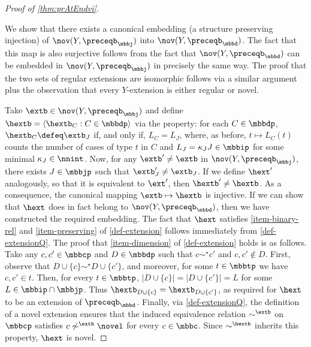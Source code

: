 \label{proofsection:prAtEndvi}\begin{proof}[Proof of \autoref{thm:prAtEndvi}]\label{proof:prAtEndvi}\label {proof-nov-iso} \par We show that there exists a canonical embedding (a structure preserving injection) of $ \nov ( Y , \preceqb _ \mbbj ) $ into $ \nov ( Y , \preceqb _ \mbbd ) $. The fact that this map is also surjective follows from the fact that $ \nov ( Y , \preceqb _ \mbbd ) $ can be embedded in $ \nov ( Y , \preceqb _ \mbbj ) $ in precisely the same way. The proof that the two sets of regular extensions are isomorphic follows via a similar argument plus the observation that every $Y$-extension is either regular or novel. \par Take $ \extb \in \nov ( Y , \preceqb _ \mbbj )$ and define $ \hextb = \langle \hextb _{C} : C \in \mbbdp \rangle $ via the property: for each $ C \in \mbbdp $, $ \hextb _{C}\defeq \extb _{J} $ if, and only if, $ L_{C}= L_{J} $, where, as before, $t \mapsto L_{C}(t) $ counts the number of cases of type $t$ in $C$ and $ L_{J} = \kappa _{J} J \in \mbbip $ for some minimal $\kappa _{J} \in \nnint $. Now, for any $ \extb ' \neq \extb $ in $ \nov ( Y , \preceqb _ \mbbj ) $, there exists $J\in \mbbjp $ such that $\extb '_{J}\neq \extb _{J}$. If we define $ \hext ' $ analogously, so that it is equivalent to $\ext '$, then $ \hextb ' \neq \hextb $. As a consequence, the canonical mapping $\extb \mapsto \hextb $ is injective. If we can show that $ \hext $ does in fact belong to $ \nov ( Y , \preceqb _ \mbbd )$, then we have constructed the required embedding. The fact that $ \hext $ satisfies \ref {item-binary-rel} and \ref {item-preserving} of \cref {def-extension} follows immediately from \cref {def-extensionQ}. The proof that \cref {item-dimension} of \cref {def-extension} holds is as follows. Take any $ c , c ' \in \mbbcp $ and $ D \in \mbbdp $ such that $ c \sim ^ \star c ' $ and $ c , c ' \notin D $. First, observe that $ D \cup \{c\} \sim ^ \star D \cup \{c'\} $, and moreover, for some $ t \in \mbbtp $ we have $ c , c ' \in t $. Then, for every $t\in \mbbtp $, $ \lvert D \cup \{c\} \rvert = \lvert D \cup \{c'\} \rvert = L$ for some $ L \in \mbbip \cap \mbbjp $. Thus $ \hextb _ { D \cup \{c\} } = \hextb _ { D \cup \{c'\}}$, as required for $ \hext $ to be an extension of $ \preceqb _{ \mbbd }$. Finally, via \cref {def-extensionQ}, the definition of a novel extension ensures that the induced equivalence relation $\sim ^{\extb }$ on $\mbbcp $ satisfies $ c \not \sim ^{\extb } \novel $ for every $ c \in \mbbc $. Since $ \sim ^{ \hextb }$ inherits this property, $ \hext $ is novel.\end{proof}
